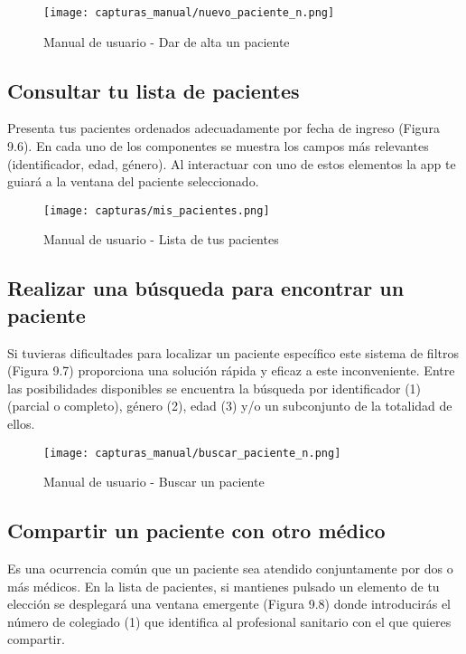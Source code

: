 \documentclass[11pt,spanish,
		listoftables,listoffigures]
		{tfgplantilla}
\begin{document}
\begin{figure}[H]
\centering
\texttt{[image: capturas\_manual/nuevo\_paciente\_n.png]}
\caption{Manual de usuario - Dar de alta un paciente}
\end{figure}

\subsection {Consultar tu lista de pacientes}

Presenta tus pacientes ordenados adecuadamente por fecha de ingreso (Figura 9.6). En cada uno de los componentes se muestra los campos más relevantes (identificador, edad, género). Al interactuar con uno de estos elementos la app te guiará a la ventana del paciente seleccionado.

\begin{figure}[H]
\centering
\texttt{[image: capturas/mis\_pacientes.png]}
\caption{Manual de usuario - Lista de tus pacientes}
\end{figure}

\newpage
\subsection {Realizar una búsqueda para encontrar un paciente}

Si tuvieras dificultades para localizar un paciente específico este sistema de filtros (Figura 9.7) proporciona una solución rápida y eficaz a este inconveniente. Entre las posibilidades disponibles se encuentra la búsqueda por identificador (1) (parcial o completo), género (2), edad (3) y/o un subconjunto de la totalidad de ellos.

\begin{figure}[H]
\centering
\texttt{[image: capturas\_manual/buscar\_paciente\_n.png]}
\caption{Manual de usuario - Buscar un paciente}
\end{figure}

\subsection {Compartir un paciente con otro médico}

Es una ocurrencia común que un paciente sea atendido conjuntamente por dos o más médicos. En la lista de pacientes, si mantienes pulsado un elemento de tu elección se desplegará una ventana emergente (Figura 9.8) donde introducirás el número de colegiado (1) que identifica al profesional sanitario con el que quieres compartir.
\end{document}
